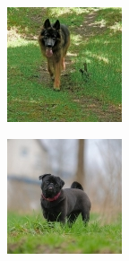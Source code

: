 \documentclass{report}
\begin{document}
\begin{figure}[h!]
\begin{subfigure}[t]{0.19\textwidth}
    \includegraphics[width=\textwidth]{dataset/dog_1.jpg}
    \label{fig:dataset-sub2}
  \end{subfigure}
  \hfill
  \begin{subfigure}[t]{0.19\textwidth}
    \centering
    \includegraphics[width=\textwidth]{dataset/dog_2.jpg}

\end{subfigure}
\end{figure}
\end{document}
